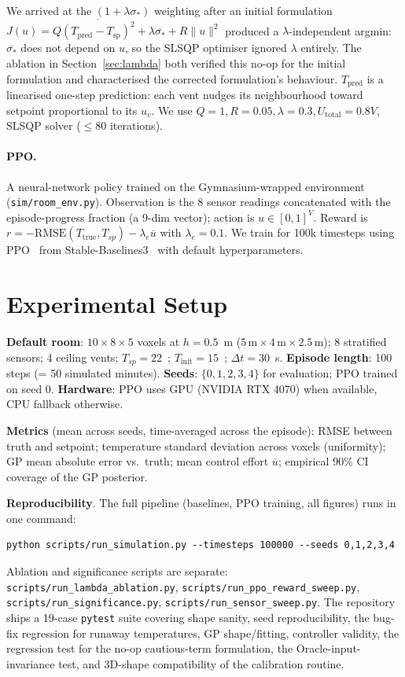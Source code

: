 \documentclass[11pt,letterpaper]{article}
\begin{document}
We arrived at the $(1 + \lambda \sigma_*)$ weighting after an initial
formulation $J(u) = Q \overline{(T_\mathrm{pred} - T_\mathrm{sp})^2} +
\lambda \overline{\sigma_*} + R\|u\|^2$ produced a $\lambda$-independent
argmin: $\overline{\sigma_*}$ does not depend on $u$, so the SLSQP
optimiser ignored $\lambda$ entirely. The ablation in
Section~\ref{sec:lambda} both verified this no-op for the initial
formulation and characterised the corrected formulation's behaviour.
$T_{\mathrm{pred}}$ is a linearised one-step prediction: each vent nudges its
neighbourhood toward setpoint proportional to its $u_v$. We use
$Q = 1, R = 0.05, \lambda = 0.3, U_{\mathrm{total}} = 0.8 V$, SLSQP solver
($\le 80$ iterations).

\paragraph{PPO.} A neural-network policy trained on the Gymnasium-wrapped
environment (\texttt{sim/room\_env.py}). Observation is the 8 sensor readings
concatenated with the episode-progress fraction (a 9-dim vector); action is
$u \in [0, 1]^V$. Reward is $r = -\mathrm{RMSE}(T_{\mathrm{true}}, T_{sp})
- \lambda_e \overline{u}$ with $\lambda_e = 0.1$. We train for 100k
timesteps using PPO~\citep{schulman2017} from
Stable-Baselines3~\citep{raffin2021} with default hyperparameters.

\section{Experimental Setup}

\textbf{Default room}: $10 \times 8 \times 5$ voxels at $h = 0.5$~m
($5\,\text{m} \times 4\,\text{m} \times 2.5\,\text{m}$); 8 stratified
sensors; 4 ceiling vents; $T_{sp} = 22$~\textcelsius; $T_{\mathrm{init}} = 15$~\textcelsius;
$\Delta t = 30$~s.
\textbf{Episode length}: 100 steps (= 50 simulated minutes).
\textbf{Seeds}: $\{0, 1, 2, 3, 4\}$ for evaluation; PPO trained on seed 0.
\textbf{Hardware}: PPO uses GPU (NVIDIA RTX 4070) when available, CPU
fallback otherwise.

\textbf{Metrics} (mean across seeds, time-averaged across the episode):
RMSE between truth and setpoint; temperature standard deviation across
voxels (uniformity); GP mean absolute error vs.\ truth; mean control
effort $\overline{u}$; empirical 90\% CI coverage of the GP posterior.

\textbf{Reproducibility}. The full pipeline (baselines, PPO training,
all figures) runs in one command:
\begin{verbatim}
python scripts/run_simulation.py --timesteps 100000 --seeds 0,1,2,3,4
\end{verbatim}
Ablation and significance scripts are separate:
\texttt{scripts/run\_lambda\_ablation.py},
\texttt{scripts/run\_ppo\_reward\_sweep.py},
\texttt{scripts/run\_significance.py},
\texttt{scripts/run\_sensor\_sweep.py}. The repository ships a 19-case
\texttt{pytest} suite covering shape sanity, seed reproducibility, the
bug-fix regression for runaway temperatures, GP shape/fitting,
controller validity, the regression test for the no-op cautious-term
formulation, the Oracle-input-invariance test, and 3D-shape compatibility
of the calibration routine.
\end{document}
